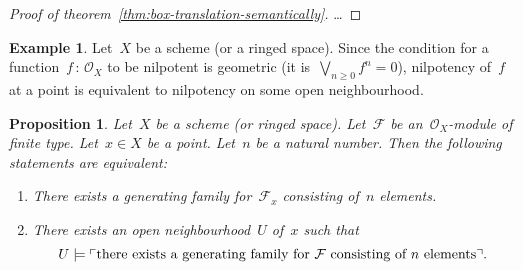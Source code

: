 \documentclass[10pt]{amsart}
\theoremstyle{definition}
\newtheorem{ex}[defn]{Example}
\theoremstyle{plain}
\newtheorem{prop}[defn]{Proposition}
\theoremstyle{remark}
\newcommand{\F}{\mathcal{F}}
\renewcommand{\O}{\mathcal{O}}
\newcommand{\?}{\,{:}\,}
\renewcommand{\_}{\mathpunct{.}\,}
\newcommand{\speak}[1]{\ulcorner\text{\textnormal{#1}}\urcorner}
\begin{document}

\begin{proof}[Proof of theorem~\ref{thm:box-translation-semantically}]
\ldots
\end{proof}

\begin{ex}Let~$X$ be a scheme (or a ringed space). Since the condition for a
function~$f\?\O_X$ to be nilpotent is geometric (it is~$\bigvee_{n \geq 0} f^n
= 0$), nilpotency of~$f$ at a point is equivalent to nilpotency on some open
neighbourhood.\end{ex}

\begin{prop}\label{prop:gen-family-n}
Let~$X$ be a scheme (or ringed space). Let~$\F$ be an~$\O_X$-module
of finite type. Let~$x \in X$ be a point. Let~$n$ be a natural number. Then the
following statements are equivalent:
\begin{enumerate}
\item There exists a generating family for~$\F_x$ consisting of~$n$ elements.
\item There exists an open neighbourhood~$U$ of~$x$ such that
\[ U \models \speak{there exists a generating family for~$\F$ consisting of~$n$
elements}. \]
\end{enumerate}
\end{prop}
\end{document}
